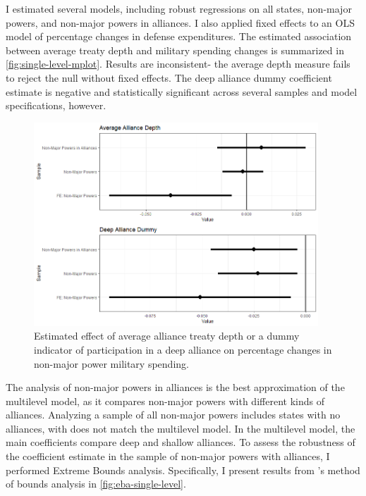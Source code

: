 \documentclass[12pt]{article}
\begin{document}
I estimated several models, including robust regressions on all states, non-major powers, and non-major powers in alliances. 
I also applied fixed effects to an OLS model of percentage changes in defense expenditures. 
The estimated association between average treaty depth and military spending changes is summarized in \autoref{fig:single-level-mplot}. 
Results are inconsistent- the average depth measure fails to reject the null without fixed effects. 
The deep alliance dummy coefficient estimate is negative and statistically significant across several samples and model specifications, however. 

\begin{figure}[htbp]
	\centering
		\includegraphics[width=0.95\textwidth]{single-level-mplot.png}
	\caption{Estimated effect of average alliance treaty depth or a dummy indicator of participation in a deep alliance on percentage changes in non-major power military spending.}
	\label{fig:single-level-mplot}
\end{figure}


The analysis of non-major powers in alliances is the best approximation of the multilevel model, as it compares non-major powers with different kinds of alliances. 
Analyzing a sample of all non-major powers includes states with no alliances, with does not match the multilevel model. 
In the multilevel model, the main coefficients compare deep and shallow alliances. 
To assess the robustness of the coefficient estimate in the sample of non-major powers with alliances, I performed Extreme Bounds analysis. 
Specifically, I present results from \citet{Sala-i-Martin1997}'s method of bounds analysis in \autoref{fig:eba-single-level}. 
\end{document}
